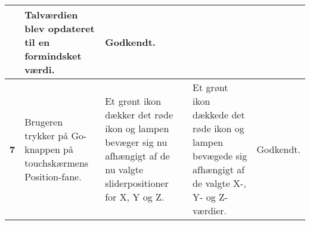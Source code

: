 \begin{center}
\begin{longtable}{|p{}|p{}|p{}|p{}|p{}|}
            & Talværdien blev opdateret til en formindsket værdi.
            & Godkendt. 
        \\ \hline
        \textbf{7} 
            & Brugeren trykker på Go-knappen på touchskærmens Position-fane.
            & Et grønt ikon dækker det røde ikon og lampen bevæger sig nu afhængigt af de nu valgte sliderpositioner for X, Y og Z.
            & Et grønt ikon dækkede det røde ikon og lampen bevægede sig afhængigt af de valgte X-, Y- og Z-værdier.	
            & Godkendt. 
        \\ \hline
	\end{longtable}
	\label{ATUC5}
\end{center}
